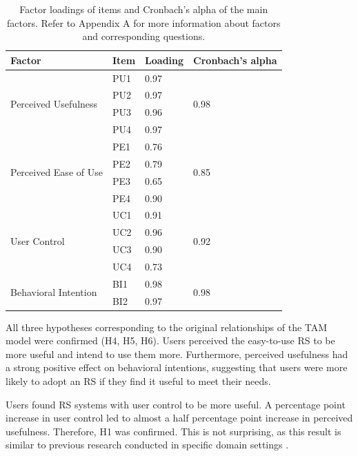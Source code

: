 \documentclass[a4paper,12pt]{article}
\begin{document}
\begin{table}[ht]
\centering
\begin{tabular}{llll}
\hline
\textbf{Factor}             & \textbf{Item} & \textbf{Loading} & \textbf{Cronbach's alpha} \\ \hline
\multirow{4}{*}{Perceived Usefulness} & PU1   & 0.97 & \multirow{4}{*}{0.98}  \\
                             & PU2   & 0.97  \\
                             & PU3   & 0.96  \\
                             & PU4   & 0.97   \\ \hline
\multirow{4}{*}{Perceived Ease of Use} & PE1   & 0.76 & \multirow{4}{*}{0.85} \\
                             & PE2   & 0.79  \\
                             & PE3   & 0.65  \\
                             & PE4   & 0.90  \\ \hline
\multirow{4}{*}{User Control} & UC1   & 0.91  & \multirow{4}{*}{0.92} \\
                             & UC2   & 0.96  \\
                             & UC3   & 0.90  \\
                             & UC4   & 0.73  \\ \hline
\multirow{2}{*}{Behavioral Intention} & BI1   & 0.98  & \multirow{2}{*}{0.98} \\
                             & BI2   & 0.97  \\ \hline
\end{tabular}
\caption[Factor loadings of items]{Factor loadings of items and Cronbach's alpha of the main factors. Refer to Appendix A for more information about factors and corresponding questions.}
\label{tab:factorloadings}
\end{table}

All three hypotheses corresponding to the original relationships of the TAM model were confirmed (H4, H5, H6). Users perceived the easy-to-use RS to be more useful and intend to use them more.  Furthermore, perceived usefulness had a strong positive effect on behavioral intentions, suggesting that users were more likely to adopt an RS if they find it useful to meet their needs.

Users found RS systems with user control to be more useful. A percentage point increase in user control led to almost a half percentage point increase in perceived usefulness. Therefore, H1 was confirmed. This is not surprising, as this result is similar to previous research conducted in specific domain settings \citep{bostandjiev2012tasteweights, millecampControllingSpotifyRecommendations2018}. 
\end{document}
